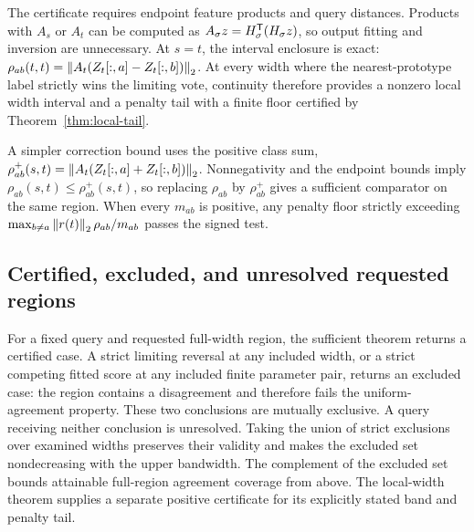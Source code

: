 The certificate requires endpoint feature products and query distances.
Products with $A_s$ or $A_t$ can be computed as
$A_\sigma z=H_\sigma^{\mathsf{T}}(H_\sigma z)$, so output fitting and inversion
are unnecessary. At $s=t$, the interval enclosure is exact:
$\rho_{ab}(t,t)=\left\lVert A_t(Z_t[:,a]-Z_t[:,b])\right\rVert_2$. At every width
where the nearest-prototype label strictly wins the limiting vote, continuity
therefore provides a nonzero local width interval and a penalty tail with a finite floor
certified by Theorem~\ref{thm:local-tail}.

A simpler correction bound uses the positive class sum,
$\rho^+_{ab}(s,t)=\left\lVert A_t(Z_t[:,a]+Z_t[:,b])\right\rVert_2$.
Nonnegativity and the endpoint bounds imply
$\rho_{ab}(s,t)\leq\rho^+_{ab}(s,t)$, so replacing $\rho_{ab}$ by
$\rho^+_{ab}$ gives a sufficient comparator on the same region.
When every $m_{ab}$ is positive, any penalty floor strictly exceeding
$\max_{b\ne a}\left\lVert r(t)\right\rVert_2\rho_{ab}/m_{ab}$ passes the signed test.

\subsection{Certified, excluded, and unresolved requested regions}
\label{sec:partition}
For a fixed query and requested full-width region, the sufficient theorem
returns a certified case. A strict limiting reversal at any included width,
or a strict competing fitted score at any included finite parameter pair,
returns an excluded case: the region contains a disagreement and therefore
fails the uniform-agreement property. These two conclusions are mutually
exclusive. A query receiving neither conclusion is unresolved. Taking the
union of strict exclusions over examined widths preserves their validity
and makes the excluded set nondecreasing with the upper bandwidth.
The complement of the excluded set bounds attainable full-region agreement
coverage from above. The local-width theorem supplies a separate positive
certificate for its explicitly stated band and penalty tail.

